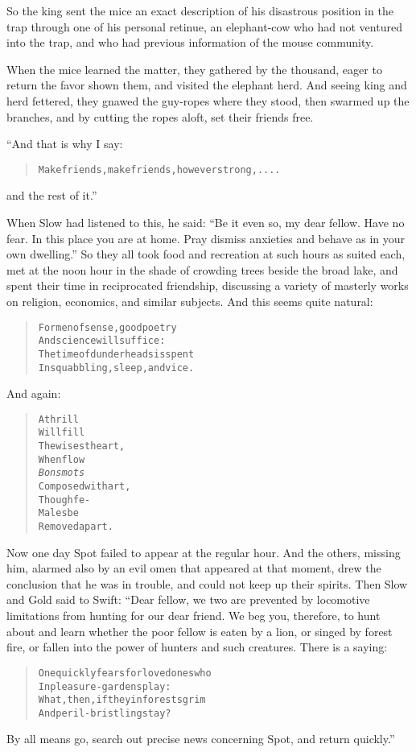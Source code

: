 \documentclass[article, twoside, 10pt]{memoir}
\renewenvironment{verbatim}{%
\begin{quote}%
\vskip -10pt%
\begin{alltt}\normalfont\small}{\end{alltt}%
\end{quote}%
\vskip -10pt
} %
\begin{document}
So the king sent the mice an exact description of his disastrous
position in the trap through one of his personal retinue, an
elephant-cow who had not ventured into the trap, and who had
previous information of the mouse community.

When the mice learned the matter, they gathered by the thousand,
eager to return the favor shown them, and visited the elephant
herd. And seeing king and herd fettered, they gnawed the guy-ropes
where they stood, then swarmed up the branches, and by cutting the
ropes aloft, set their friends free.

“And that is why I say:

\begin{verbatim}
Make friends, make friends, however strong, ....
\end{verbatim}
and the rest of it.”

When Slow had listened to this, he said:
``Be it even so, my dear fellow. Have no fear. In this place you are at home. Pray dismiss anxieties and behave as in your own dwelling.''
So they all took food and recreation at such hours as suited each,
met at the noon hour in the shade of crowding trees beside the
broad lake, and spent their time in reciprocated friendship,
discussing a variety of masterly works on religion, economics, and
similar subjects. And this seems quite natural:

\begin{verbatim}
For men of sense, good poetry
    And science will suffice:
The time of dunderheads is spent
    In squabbling, sleep, and vice.
\end{verbatim}
And again:

\begin{verbatim}
A thrill
Will fill
    The wisest heart,
When flow
\emph{Bons mots}
    Composed with art,
Though fe-
Males be
    Removed apart.
\end{verbatim}
Now one day Spot failed to appear at the regular hour. And the
others, missing him, alarmed also by an evil omen that appeared at
that moment, drew the conclusion that he was in trouble, and could
not keep up their spirits. Then Slow and Gold said to Swift: “Dear
fellow, we two are prevented by locomotive limitations from hunting
for our dear friend. We beg you, therefore, to hunt about and learn
whether the poor fellow is eaten by a lion, or singed by forest
fire, or fallen into the power of hunters and such creatures. There
is a saying:

\begin{verbatim}
One quickly fears for loved ones who
    In pleasure-gardens play:
What, then, if they in forests grim
    And peril-bristling stay?
\end{verbatim}
By all means go, search out precise news concerning Spot, and
return quickly.”
\end{document}
